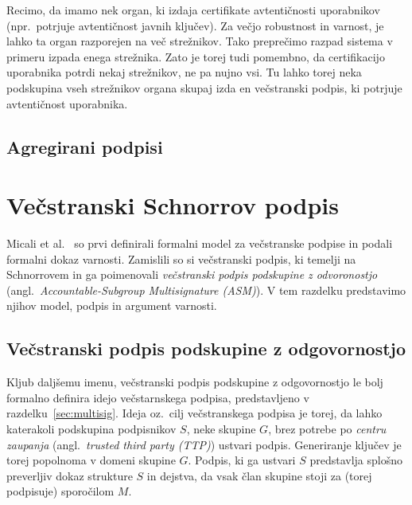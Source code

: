 \documentclass[isrm2, tisk]{fmfdelo}
\begin{document}
\begin{primer}
    Recimo, da imamo nek organ, ki izdaja certifikate avtentičnosti uporabnikov (npr.\ potrjuje 
    avtentičnost javnih ključev). Za večjo robustnost in varnost, je lahko ta organ razporejen 
    na več strežnikov. Tako preprečimo razpad sistema v primeru izpada enega strežnika. Zato je 
    torej tudi pomembno, da certifikacijo uporabnika potrdi nekaj strežnikov, ne pa nujno vsi. 
    Tu lahko torej neka podskupina vseh strežnikov organa skupaj izda en večstranski podpis, ki 
    potrjuje avtentičnost uporabnika.
\end{primer}

\subsection{Agregirani podpisi}

\section{Večstranski Schnorrov podpis}
Micali et al.~\cite{micali2001asm} so prvi definirali formalni model za večstranske podpise in podali 
formalni dokaz varnosti. Zamislili so si večstranski podpis, ki temelji na Schnorrovem in ga poimenovali 
\textit{večstranski podpis podskupine z odvoronostjo} (angl.\ \textit{Accountable-Subgroup Multisignature 
(ASM)}). V tem razdelku predstavimo njihov model, podpis in argument varnosti.

\subsection{Večstranski podpis podskupine z odgovornostjo}
Kljub daljšemu imenu, večstranski podpis podskupine z odgovornostjo le bolj formalno definira idejo 
večstarnskega podpisa, predstavljeno v razdelku~\ref{sec:multisig}. Ideja oz.\ cilj večstranskega 
podpisa je torej, da lahko katerakoli podskupina podpisnikov $S$, neke skupine $G$, brez potrebe po 
\textit{centru zaupanja} (angl.\ \textit{trusted third party (TTP)}) ustvari podpis. 
Generiranje ključev je torej popolnoma v domeni skupine $G$. Podpis, ki ga ustvari $S$ predstavlja 
splošno preverljiv dokaz strukture $S$ in dejstva, da vsak član skupine stoji za (torej podpisuje) 
sporočilom $M$.
\end{document}
